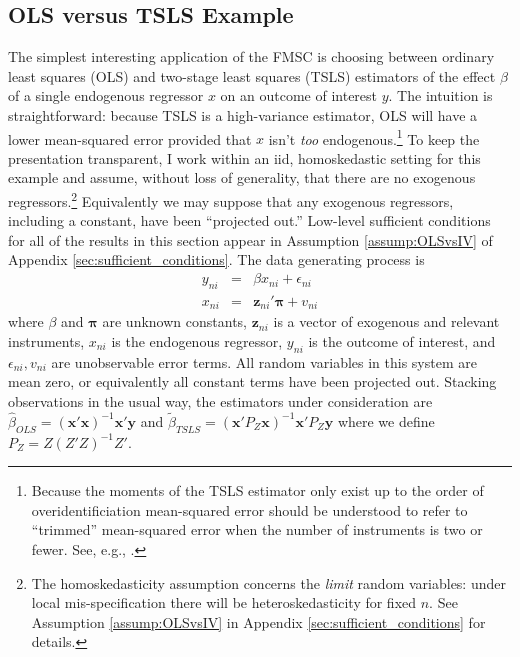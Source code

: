 \subsection{OLS versus TSLS Example}
\label{sec:OLSvsIVExample}
The simplest interesting application of the FMSC is choosing between ordinary least squares (OLS) and two-stage least squares (TSLS) estimators of the effect $\beta$ of a single endogenous regressor $x$ on an outcome of interest $y$.
The intuition is straightforward: because TSLS is a high-variance estimator, OLS will have a lower mean-squared error provided that $x$ isn't \emph{too} endogenous.\footnote{Because the moments of the TSLS estimator only exist up to the order of overidentificiation \citep{Phillips1980} mean-squared error should be understood to refer to ``trimmed'' mean-squared error when the number of instruments is two or fewer. See, e.g., \cite{HansenShrink}.}
To keep the presentation transparent, I work within an iid, homoskedastic setting for this example and assume, without loss of generality, that there are no exogenous regressors.\footnote{The homoskedasticity assumption concerns the \emph{limit} random variables: under local mis-specification there will be heteroskedasticity for fixed $n$. See Assumption \ref{assump:OLSvsIV} in Appendix \ref{sec:sufficient_conditions} for details.}
Equivalently we may suppose that any exogenous regressors, including a constant, have been ``projected out.''
Low-level sufficient conditions for all of the results in this section appear in Assumption \ref{assump:OLSvsIV} of Appendix \ref{sec:sufficient_conditions}.
The data generating process is
    \begin{eqnarray}
			y_{ni} &=& \beta x_{ni}  + \epsilon_{ni}\\
	x_{ni} &=& \mathbf{z}_{ni}' \boldsymbol{\pi} + v_{ni}
	\end{eqnarray}
where $\beta$ and $\boldsymbol{\pi}$ are unknown constants, $\mathbf{z}_{ni}$ is a vector of exogenous and relevant instruments, $x_{ni}$ is the endogenous regressor, $y_{ni}$ is the outcome of interest, and $\epsilon_{ni}, v_{ni}$ are unobservable error terms.
All random variables in this system are mean zero, or equivalently all constant terms have been projected out. 
Stacking observations in the usual way, the estimators under consideration are $\widehat{\beta}_{OLS} = \left(\mathbf{x}'\mathbf{x}\right)^{-1}\mathbf{x}'\mathbf{y}$ and
$\widetilde{\beta}_{TSLS} = \left(\mathbf{x}'P_Z\mathbf{x}\right)^{-1}\mathbf{x}'P_Z\mathbf{y}$ where we define $P_Z = Z(Z'Z)^{-1}Z'$. 

